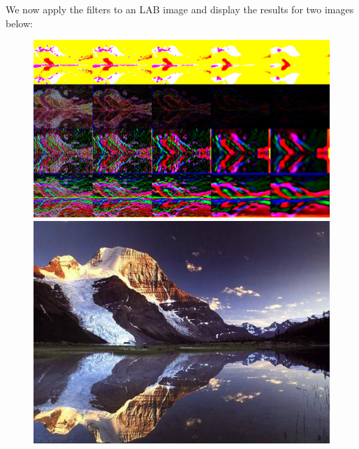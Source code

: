 \documentclass[12pt]{article}
\newenvironment{problem}[2][Problem]{\begin{trivlist}
\item[\hskip \labelsep {\bfseries #1}\hskip \labelsep {\bfseries #2.}]}{\end{trivlist}}
\begin{document}
 \begin{problem}{1.1} We now apply the filters to an LAB image and display the results for two images below:
 
\begin{figure}
  \centering
  \begin{minipage}[b]{0.45\textwidth}
    \includegraphics[width=\textwidth]{images/1}
  \end{minipage}
  \begin{minipage}[b]{0.35\textwidth}
    \includegraphics[width=\textwidth]{images/2_o}
  \end{minipage}
\end{figure}


\end{problem}
\end{document}
